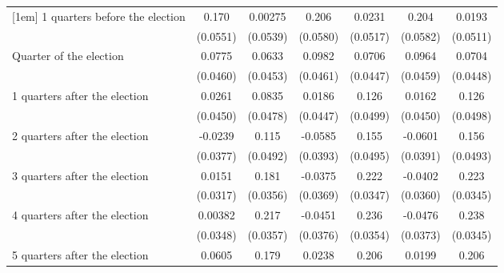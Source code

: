 \begin{table}[htbp]
\begin{tabular}{l*{6}{c}}
[1em]
 1 quarters before the election&       0.170\sym{**} &     0.00275         &       0.206\sym{***}&      0.0231         &       0.204\sym{***}&      0.0193         \\
                    &    (0.0551)         &    (0.0539)         &    (0.0580)         &    (0.0517)         &    (0.0582)         &    (0.0511)         \\
[1em]
Quarter of the election&      0.0775         &      0.0633         &      0.0982\sym{*}  &      0.0706         &      0.0964\sym{*}  &      0.0704         \\
                    &    (0.0460)         &    (0.0453)         &    (0.0461)         &    (0.0447)         &    (0.0459)         &    (0.0448)         \\
[1em]
 1 quarters after the election&      0.0261         &      0.0835         &      0.0186         &       0.126\sym{*}  &      0.0162         &       0.126\sym{*}  \\
                    &    (0.0450)         &    (0.0478)         &    (0.0447)         &    (0.0499)         &    (0.0450)         &    (0.0498)         \\
[1em]
 2 quarters after the election&     -0.0239         &       0.115\sym{*}  &     -0.0585         &       0.155\sym{**} &     -0.0601         &       0.156\sym{**} \\
                    &    (0.0377)         &    (0.0492)         &    (0.0393)         &    (0.0495)         &    (0.0391)         &    (0.0493)         \\
[1em]
 3 quarters after the election&      0.0151         &       0.181\sym{***}&     -0.0375         &       0.222\sym{***}&     -0.0402         &       0.223\sym{***}\\
                    &    (0.0317)         &    (0.0356)         &    (0.0369)         &    (0.0347)         &    (0.0360)         &    (0.0345)         \\
[1em]
 4 quarters after the election&     0.00382         &       0.217\sym{***}&     -0.0451         &       0.236\sym{***}&     -0.0476         &       0.238\sym{***}\\
                    &    (0.0348)         &    (0.0357)         &    (0.0376)         &    (0.0354)         &    (0.0373)         &    (0.0345)         \\
[1em]
 5 quarters after the election&      0.0605         &       0.179\sym{***}&      0.0238         &       0.206\sym{***}&      0.0199         &       0.206\sym{***}\\

\end{tabular}
\end{table}
